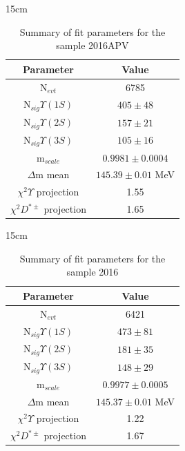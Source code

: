 \begin{table}[!htbp]{15cm}
  \caption{Summary of fit parameters for the sample 2016APV}\label{tab:fit_summary_2016APV}
  \begin{tabular}{ c | c }
    Parameter & Value \\ 
    \hline
    N$_{evt}$                    & 6785 \\ \hline
    N$_{sig} \Upsilon(1S)$       & $405 \pm 48$ \\ \hline
    N$_{sig} \Upsilon(2S)$       & $157 \pm 21$ \\ \hline
    N$_{sig} \Upsilon(3S)$       & $105 \pm 16$ \\ \hline
    m$_{scale}$                  & $0.9981 \pm 0.0004$ \\ \hline
    $\Delta$m mean               & $145.39 \pm 0.01$ MeV \\ \hline
    $\chi^2 \Upsilon$ projection & 1.55 \\ \hline
    $\chi^2 D^{*\pm}$ projection & 1.65 \\ \hline
  \end{tabular}
\end{table}

\begin{table}[!htbp]{15cm}
  \caption{Summary of fit parameters for the sample 2016}\label{tab:fit_summary_2016}
  \begin{tabular}{ c | c }
    Parameter & Value \\ 
    \hline
    N$_{evt}$                    & 6421 \\ \hline
    N$_{sig} \Upsilon(1S)$       & $473 \pm 81$ \\ \hline
    N$_{sig} \Upsilon(2S)$       & $181 \pm 35$ \\ \hline
    N$_{sig} \Upsilon(3S)$       & $148 \pm 29$ \\ \hline
    m$_{scale}$                  & $0.9977 \pm 0.0005$ \\ \hline
    $\Delta$m mean               & $145.37 \pm 0.01$ MeV \\ \hline
    $\chi^2 \Upsilon$ projection & 1.22 \\ \hline
    $\chi^2 D^{*\pm}$ projection & 1.67 \\ \hline
  \end{tabular}
\end{table}

